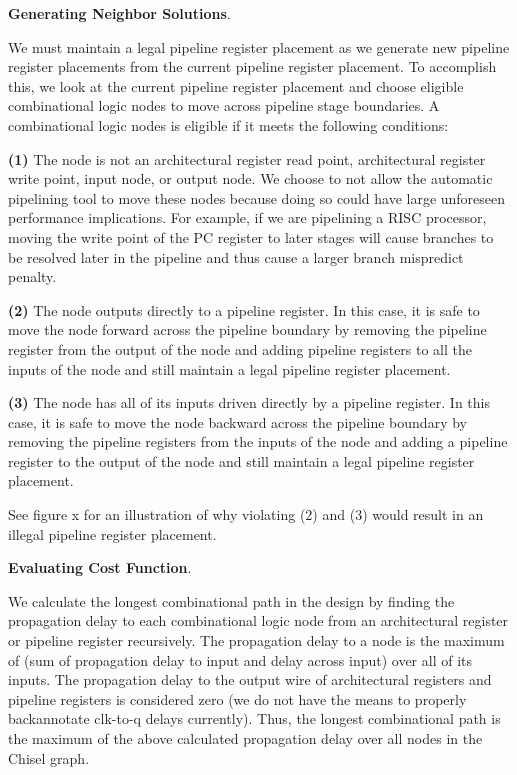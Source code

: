 {\bf Generating Neighbor Solutions}.

We must maintain a legal pipeline register placement as we generate new pipeline register placements from the current pipeline register placement. To accomplish this, we look at the current pipeline register placement and choose eligible combinational logic nodes to move across pipeline stage boundaries. A combinational logic nodes is eligible if it meets the following conditions:

{\bf (1)} 
The node is not an architectural register read point, architectural register write point, input node, or output node. We choose to not allow the automatic pipelining tool to move these nodes because doing so could have large unforeseen performance implications. For example, if we are pipelining a RISC processor, moving the write point of the PC register to later stages will cause branches to be resolved later in the pipeline and thus cause a larger branch mispredict penalty.

{\bf (2)}  
The node outputs directly to a pipeline register. In this case, it is safe to move the node forward across the pipeline boundary by removing the pipeline register from the output of the node and adding pipeline registers to all the inputs of the node and still maintain a legal pipeline register placement. 

{\bf (3)} 
The node has all of its inputs driven directly by a pipeline register. In this case, it is safe to move the node backward across the pipeline boundary by removing the pipeline registers from the inputs of the node and adding a pipeline register to the output of the node and still maintain a legal pipeline register placement.

See figure x for an illustration of why violating (2) and (3) would result in an illegal pipeline register placement.

{\bf Evaluating Cost Function}.

We calculate the longest combinational path in the design by finding the propagation delay to each combinational logic node from an architectural register or pipeline register recursively. The propagation delay to a node is the maximum of (sum of propagation delay to input and delay across input) over all of its inputs. The propagation delay to the output wire of architectural registers and pipeline registers is considered zero (we do not have the means to properly backannotate clk-to-q delays currently).  Thus, the longest combinational path is the maximum of the above calculated propagation delay over all nodes in the Chisel graph.

